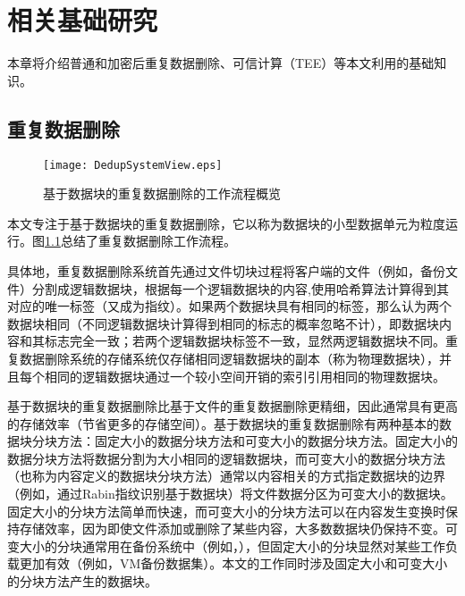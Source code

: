 \chapter{相关基础研究}
\label{chapter:background}

本章将介绍普通和加密后重复数据删除、可信计算（TEE）等本文利用的基础知识。

\section{重复数据删除}
\label{sec:background-deduplication}

\begin{figure}[!htb]
    \small
    \centering
    \texttt{[image: DedupSystemView.eps]}
    \caption{基于数据块的重复数据删除的工作流程概览} 
    \label{fig:重复数据删除的工作流程概览}
\end{figure}

本文专注于基于数据块的重复数据删除，它以称为数据块的小型数据单元为粒度运行。图\ref{fig:重复数据删除的工作流程概览}总结了重复数据删除工作流程。 

具体地，重复数据删除系统首先通过文件切块过程将客户端的文件（例如，备份文件）分割成逻辑数据块，根据每一个逻辑数据块的内容,使用哈希算法计算得到其对应的唯一标签（又成为指纹）。如果两个数据块具有相同的标签，那么认为两个数据块相同（不同逻辑数据块计算得到相同的标志的概率忽略不计\cite{black2006compare}），即数据块内容和其标志完全一致；若两个逻辑数据块标签不一致，显然两逻辑数据块不同。重复数据删除系统的存储系统仅存储相同逻辑数据块的副本（称为物理数据块），并且每个相同的逻辑数据块通过一个较小空间开销的索引引用相同的物理数据块。  

基于数据块的重复数据删除比基于文件的重复数据删除更精细，因此通常具有更高的存储效率（节省更多的存储空间）。基于数据块的重复数据删除有两种基本的数据块分块方法：固定大小的数据分块方法和可变大小的数据分块方法。固定大小的数据分块方法将数据分割为大小相同的逻辑数据块，而可变大小的数据分块方法（也称为内容定义的数据块分块方法）通常以内容相关的方式指定数据块的边界（例如，通过Rabin指纹识别基于数据块\cite{rabin1981fingerprinting}）将文件数据分区为可变大小的数据块。固定大小的分块方法简单而快速，而可变大小的分块方法可以在内容发生变换时保持存储效率，因为即使文件添加或删除了某些内容，大多数数据块仍保持不变。可变大小的分块通常用在备份系统中（例如，\cite{zhu2008avoiding,lillibridge2009sparse}），但固定大小的分块显然对某些工作负载更加有效（例如，VM备份数据集\cite{jin2009effectiveness}）。本文的工作同时涉及固定大小和可变大小的分块方法产生的数据块。

